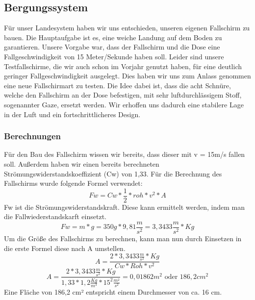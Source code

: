 \subsection{Bergungssystem}
Für unser Landesystem haben wir uns entschieden, unseren eigenen Fallschirm zu bauen. Die Hauptaufgabe ist es, eine weiche Landung auf dem Boden zu garantieren. Unsere Vorgabe war, dass der Fallschirm und die Dose eine Fallgeschwindigkeit von 15 Meter/Sekunde haben soll. Leider sind unsere Testfallschirme, die wir auch schon im Vorjahr genutzt haben, für eine deutlich geringer Fallgeschwindigkeit ausgelegt. Dies haben wir uns zum Anlass genommen eine neue Fallschirmart zu testen. Die Idee dabei ist, dass die acht Schnüre, welche den Fallschirm an der Dose befestigen, mit sehr luftdurchlässigem Stoff, sogenannter Gaze, ersetzt werden. Wir erhoffen uns dadurch eine stabilere Lage in der Luft und ein fortschrittlicheres Design.

\subsubsection{Berechnungen}
Für den Bau des Fallschirm wissen wir bereits, dass dieser mit v = 15m/s fallen soll. Außerdem haben wir einen bereits berechneten Strömungswiderstandskoeffizient (Cw) von 1,33. Für die Berechnung des Fallschirms wurde folgende Formel verwendet:
\[
Fw = Cw*\frac{1}{2}*roh*v^2*A
\]
Fw ist die Strömungswiderstandskraft. Diese kann ermittelt werden, indem man die Fallwiederstandskarft einsetzt.
\[
Fw = m * g = 350g * 9,81\frac{m}{s^2} = 3,3433\frac{m}{s^2}*Kg
\]
Um die Größe des Fallschirms zu berechnen, kann man nun durch Einsetzen in die erste Formel diese nach A umstellen.
\[
A=\frac{2*3,3433\frac{m}{s^2}*Kg}{Cw*Roh*v^2}
\]
\[
A=\frac{2*3,3433\frac{m}{s^2}*Kg}{1,33*1,2\frac{Kg}{m^3}*15^2\frac{m^2}{s^2}} = 0,01862m^{2} \text{ oder } 186,2cm^{2}
\]
Eine Fläche von 186,2 cm² entspricht einem Durchmesser von ca. 16 cm.

